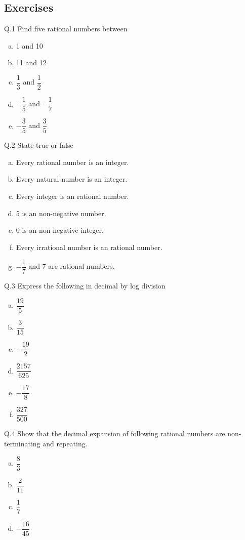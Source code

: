 \documentclass[a4paper,10pt]{article}
\begin{document}
\subsection{Exercises}
Q.1 {Find five rational numbers between}
\begin{multicols}{5}
\begin{enumerate}[a.]
\item 1 and 10
\item 11 and 12
\item $\dfrac{1}{3}$ and $\dfrac{1}{2}$
\item $-\dfrac{1}{5}$ and $-\dfrac{1}{7}$
\item $-\dfrac{3}{5}$ and $\dfrac{3}{5}$  
\end{enumerate}
\end{multicols}
\noindent Q.2 {State true or false}
\begin{enumerate}[a.]
\item Every rational number is an integer.
\item Every natural number is an integer.
\item Every integer is an rational number.
\item 5 is an non-negative number.
\item 0 is an non-negative integer.
\item Every irrational number is an rational number.
\item $-\dfrac{1}{7}$ and 7 are rational numbers.
\end{enumerate}
Q.3 {Express the following in decimal by log division}
\begin{multicols}{5}
\begin{enumerate}[a.]
\item $\dfrac{19}{5}$
\item $\dfrac{3}{15}$
\item $-\dfrac{19}{2}$
\item $\dfrac{2157}{625}$
\item $-\dfrac{17}{8}$
\item $\dfrac{327}{500}$
\end{enumerate}
\end{multicols}
\noindent Q.4 {Show that the decimal expansion of following rational
numbers are non-terminating and
repeating.}
\begin{multicols}{4}
\begin{enumerate}[a.]
 \item $\dfrac{8}{3}$
 \item $\dfrac{2}{11}$
 \item $\dfrac{1}{7}$
 \item $-\dfrac{16}{45}$
\end{enumerate}
\end{multicols}
\end{document}
